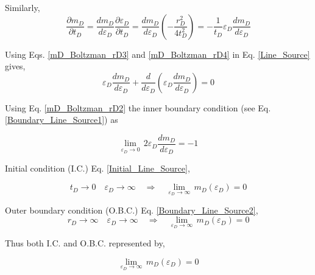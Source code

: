 \documentclass{llncs}
\numberwithin{equation}{section}
\numberwithin{figure}{section}
\numberwithin{table}{section}
\begin{document}
    Similarly,
    \begin{equation}
        \frac{\partial {{m}_{D}}}{\partial {{t}_{D}}}=\frac{d{{m}_{D}}}{d{{\varepsilon }_{D}}}\frac{\partial {{\varepsilon }_{D}}}{\partial {{t}_{D}}}=\frac{d{{m}_{D}}}{d{{\varepsilon }_{D}}}\left( -\frac{r_{D}^{2}}{4t_{D}^{2}} \right)=-\frac{1}{{{t}_{D}}}{{\varepsilon }_{D}}\frac{d{{m}_{D}}}{d{{\varepsilon }_{D}}}
        \label{mD_Boltzman_rD4}
    \end{equation}

    Using Eqs. \ref{mD_Boltzman_rD3} and \ref{mD_Boltzman_rD4} in Eq. \ref{Line_Source} gives,
    \begin{equation}
    {{\varepsilon }_{D}}\frac{d{{m}_{D}}}{d{{\varepsilon }_{D}}}+\frac{d}{d{{\varepsilon }_{D}}}\left( {{\varepsilon }_{D}}\frac{d{{m}_{D}}}{d{{\varepsilon }_{D}}} \right)=0
        \label{mD_Boltzman_Final}
    \end{equation}

    Using Eq. \ref{mD_Boltzman_rD2}  the inner boundary condition (see Eq. \ref{Boundary_Line_Source1})  as

    \begin{equation}
        \underset{{{\varepsilon }_{D}}\to 0}{\mathop{\lim }}\,2{{\varepsilon }_{D}}\frac{d{{m}_{D}}}{d{{\varepsilon }_{D}}}=-1
        \label{line_source_Boltzman_BC}
    \end{equation}


    Initial condition (I.C.) Eq. \ref{Initial_Line_Source},

    \begin{equation*}
        {{t}_{D}}\to 0\quad {{\varepsilon }_{D}}\to \infty \quad \Rightarrow \quad \underset{{{\varepsilon }_{D}}\to \infty }{\mathop{\lim }}\,{{m}_{D}}\left( {{\varepsilon }_{D}} \right)=0
    \end{equation*}

    Outer boundary condition (O.B.C.) Eq. \ref{Boundary_Line_Source2},
    \begin{equation*}
        {{r}_{D}}\to \infty \quad {{\varepsilon }_{D}}\to \infty \quad \Rightarrow \quad \underset{{{\varepsilon }_{D}}\to \infty }{\mathop{\lim }}\,{{m}_{D}}\left( {{\varepsilon }_{D}} \right)=0
    \end{equation*}

    Thus both I.C. and O.B.C.  represented by,

    \begin{equation}
        \underset{{{\varepsilon }_{D}}\to \infty }{\mathop{\lim }}\,{{m}_{D}}\left( {{\varepsilon }_{D}} \right)=0
        \label{line_source_Boltzman_BC2}
    \end{equation}
\end{document}
